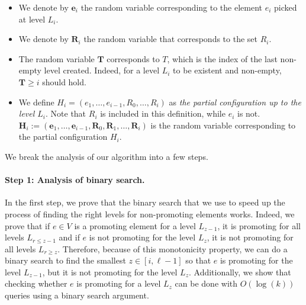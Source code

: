 \documentclass[11pt]{article}
\newcommand{\bR}{\ensuremath{\mathbf{R}}}
\newcommand{\bE}{\ensuremath{\mathbf{e}}}
\newcommand{\bT}{\ensuremath{\mathbf{T}}}
\newcommand{\bH}{\ensuremath{\mathbf{H}}}
\begin{document}
\begin{tcolorbox}[width=\linewidth, colback=white!80!gray,boxrule=0pt,frame hidden, sharp corners]


\begin{itemize}
    \item  We denote by $\bE_i$ the random variable corresponding to the element $e_i$ picked at level $L_i$. 
     \item  We denote by $\bR_i$ the random variable that corresponds to the set $R_i$.
    \item  The random variable $\bT$ corresponds to $T$, which is the index of the last non-empty level created. 
    Indeed, for a level $L_i$ to be existent and non-empty, $\bT \ge i$ should hold. 
    
    \item We define
    $H_i = (e_1, \dots, e_{i-1}, R_0, \dots, R_{i})$
    as \emph{the partial configuration up to the level $L_i$}.
    Note that $R_{i}$ is included in this definition, while $e_{i}$ is not.
    $\bH_i := (\bE_1, \dots, \bE_{i-1}, \bR_0,  \bR_{1}, \dots, \bR_{i})$ is the random variable corresponding to the partial configuration $H_i$.
\end{itemize}

\end{tcolorbox}

We break the analysis of our algorithm into a few steps. 

\paragraph{Step 1: Analysis of binary search.} 
In the first step, we prove that the binary search that 
we use to speed up the process of finding the right levels for non-promoting elements  
works. Indeed, we prove that if $e \in V$ is a promoting element for a level $L_{z-1}$, 
it is promoting  for all levels $L_{r \le z-1}$ and 
if $e$ is not promoting  for the level $L_{z}$, 
it is not promoting  for all levels $L_{r \ge z}$. 
Therefore, because of this monotonicity property, we can do a binary search to find the smallest $z \in [i,\ell-1]$ so that 
$e$ is promoting  for the level $L_{z-1}$, but it is not promoting  for the level $L_{z}$. 
Additionally, we show that checking
whether $e$ is promoting for a level $L_{z}$ can be done with $O(\log(k))$ queries using a binary search argument.
\end{document}
